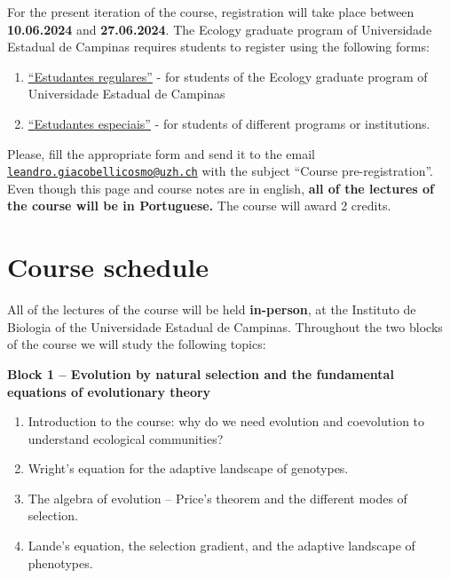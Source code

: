 \documentclass[
]{book}
\providecommand{\tightlist}{%
  \setlength{\itemsep}{0pt}\setlength{\parskip}{0pt}}
\begin{document}
For the present iteration of the course, registration will take place between \textbf{10.06.2024} and \textbf{27.06.2024}. The Ecology graduate program of Universidade Estadual de Campinas requires students to register using the following forms:

\begin{enumerate}
\def\labelenumi{\arabic{enumi})}
\tightlist
\item
  \href{https://drive.google.com/file/d/1fRILwlcdKFloCCqvmGSjI9ucSElKDnaJ/view}{``Estudantes regulares''} - for students of the Ecology graduate program of Universidade Estadual de Campinas
\item
  \href{https://www.dac.unicamp.br/sistemas/formularios/inscricao_disciplinas_eventuais_pos_aut.php}{``Estudantes especiais''} - for students of different programs or institutions.
\end{enumerate}

Please, fill the appropriate form and send it to the email \href{mailto:leandro.giacobellicosmo@uzh.ch}{\nolinkurl{leandro.giacobellicosmo@uzh.ch}} with the subject ``Course pre-registration''. Even though this page and course notes are in english, \textbf{all of the lectures of the course will be in Portuguese.} The course will award 2 credits.

\hypertarget{course-schedule}{%
\section{Course schedule}\label{course-schedule}}

All of the lectures of the course will be held \textbf{in-person}, at the Instituto de Biologia of the Universidade Estadual de Campinas. Throughout the two blocks of the course we will study the following topics:

\textbf{Block 1 -- Evolution by natural selection and the fundamental equations of evolutionary theory}

\begin{enumerate}
\def\labelenumi{\arabic{enumi})}
\tightlist
\item
  Introduction to the course: why do we need evolution and coevolution to understand ecological communities?
\item
  Wright's equation for the adaptive landscape of genotypes.
\item
  The algebra of evolution -- Price's theorem and the different modes of selection.
\item
  Lande's equation, the selection gradient, and the adaptive landscape of phenotypes.
\end{enumerate}
\end{document}
